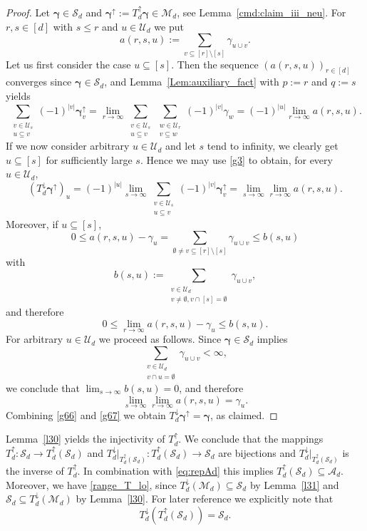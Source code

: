 \documentclass{article}
\newcommand{\bg}{{\boldsymbol{\gamma}}}
\newcommand{\U}  {\mathcal{U}}
\newcommand{\M}  {\mathcal{M}}
\newcommand{\SSS}{\mathcal{S}}
\newcommand{\A}{\mathcal{A}}
\newcommand{\lo}{\downarrow}
\newcommand{\up}{\uparrow}
\theoremstyle{plain}
\theoremstyle{definition}
\begin{document}
\begin{proof}
Let $\bg \in \SSS_d$ and $\bg^\up := T^\up_d \bg \in \M_d$, see
Lemma~\ref{cmd:claim_iii_neu}.
For $r,s \in [d]$ with $s \leq r$ and $u \in \U_d$ we put
\[
a(r,s,u) := 
\sum_{v \subseteq [r] \setminus [s]} 
\gamma_{u \cup v}.
\]
Let us first consider the case $u \subseteq [s]$. Then
the sequence $(a(r,s,u))_{r \in [d]}$ 
converges since $\bg \in \SSS_d$, and
Lemma~\ref{Lem:auxiliary_fact} with $p := r$ and $q :=s$ yields 
\[
\sum_{\substack{v\in \U_s \\ u \subseteq v}} (-1)^{|v|} \bg^\up_v
=
\lim_{r \to \infty}
\sum_{\substack{v\in \U_s \\ u \subseteq v}} 
\sum_{\substack{w\in \U_r \\ v \subseteq w}} 
(-1)^{|v|} 
\gamma_w
= (-1)^{|u|} \lim_{r \to \infty} a(r,s,u).
\]
If we now consider arbitrary $u \in \U_d$ and let $s$ tend to 
infinity, 
we clearly get $u \subseteq [s]$ for sufficiently large $s$. Hence we may
use \eqref{g3} to obtain, for every $u \in \U_d$,
\begin{equation}\label{g66}
\left(T^\lo_d \bg^\up\right)_u
= 
(-1)^{|u|} \lim_{s \to \infty}
\sum_{\substack{v\in \U_s \\ u \subseteq v}} (-1)^{|v|} \bg^\up_v
=
\lim_{s \to \infty} \lim_{r \to \infty} a(r,s,u).
\end{equation}
Moreover, if $u \subseteq [s]$,
\[
0 \leq a(r,s,u) - 
\gamma_u = 
\sum_{\emptyset \neq v \subseteq [r] \setminus [s]}
\gamma_{u \cup v} \leq b(s,u)
\]
with
\[
b(s,u) :=
\sum_{\substack{{v \in \U_d} \\ v \neq \emptyset, v \cap [s] = 
\emptyset}
}\gamma_{u \cup v},
\]
and therefore
\[
0 \leq \lim_{r \to \infty} a(r,s,u) - 
\gamma_u \leq b(s,u).
\]
For arbitrary $u \in \U_d$ we proceed as
follows. Since $\bg \in \SSS_d$ implies
\[
\sum_{\substack{v \in \U_d \\ v \cap u = \emptyset}}
\gamma_{u \cup v} < \infty,
\]
we conclude that $\lim_{s \to \infty} b(s,u) = 0$, and therefore
\begin{equation}\label{g67}
\lim_{s \to \infty} \lim_{r \to \infty} a(r,s,u) = 
\gamma_u.
\end{equation}
Combining \eqref{g66} and \eqref{g67} we obtain
$T^\lo_d \bg^\up =\bg$, as claimed.
\end{proof}

Lemma~\ref{l30} yields
the injectivity of $T^\up_d$.
We conclude that the mappings
$T^\up_d \colon \SSS_d \to T^\up_d(\SSS_d)$ and 
$T^\lo_d|_{T^\up_d(\SSS_d)} \colon T^\up_d(\SSS_d) \to \SSS_d$ are 
bijections and 
$T^\lo_d|_{T^\up_d(\SSS_d)}$ is the inverse of $T^\up_d$. 
In combination with \eqref{eq:repAd} this implies 
$T^\up_d(\SSS_d) \subseteq \A_d$. Moreover, we have
\eqref{range_T_lo}, since 
$T^\lo_d (\M_d) \subseteq \SSS_d$ by Lemma~\ref{l31}
and
$\SSS_d \subseteq T^\lo_d (\M_d)$ by Lemma~\ref{l30}.
For later reference we explicitly note that
\begin{equation}\label{g79}
T^\lo_d \left(T^\up_d(\SSS_d)\right) = \SSS_d.
\end{equation}
\end{document}
